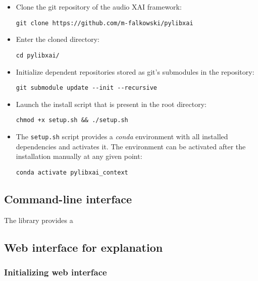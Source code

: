 \documentclass[
    bindingoffset=5mm,  %
    footnoteindent=3mm, %
    hyphenation=true    %
]{src/wut-thesis}
\begin{document}
\begin{itemize}
    \item Clone the git repository of the audio XAI framework:
\begin{verbatim}
git clone https://github.com/m-falkowski/pylibxai
\end{verbatim}
    \item Enter the cloned directory:
\begin{verbatim}
cd pylibxai/
\end{verbatim}
    \item Initialize dependent repositories stored as git's submodules in the repository:
\begin{verbatim}
git submodule update --init --recursive
\end{verbatim}
    \item Launch the install script that is present in the root directory:
\begin{verbatim}
chmod +x setup.sh && ./setup.sh
\end{verbatim}
    \item The \texttt{setup.sh} script provides a \emph{conda} environment with all installed dependencies and activates it. The environment can be activated after the installation manually at any given point:
\begin{verbatim}
conda activate pylibxai_context
\end{verbatim}
\end{itemize}

\subsection{Command-line interface} \label{ch4:CmdTool}

The library provides a 

\subsection{Web interface for explanation}
\subsubsection{Initializing web interface}
\end{document}

